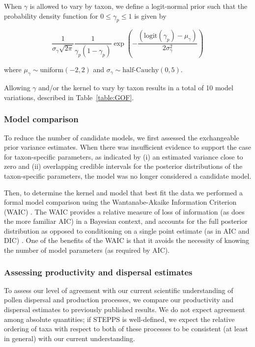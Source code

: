 \documentclass[12pt]{article}
\begin{document}
When $\gamma$ is allowed to vary by taxon, we define a logit-normal
prior such that the probability density function for $0 \leq \gamma_p
\leq 1$ is given by
\begin{linenomath*}
\begin{equation}
\frac{1}{\sigma_\gamma \sqrt{2 \pi}}\frac{1}{ \gamma_p ( 1 - \gamma_p )}\exp \left(- \frac{(\text{logit}(\gamma_p) - \mu_{\gamma})}{2 \sigma_{\gamma}^2} \right)
\end{equation} 
\end{linenomath*}
where $\mu_{\gamma} \sim \text{uniform}(-2, 2)$ and $\sigma_{\gamma}
\sim \text{half-Cauchy}(0,5)$.

Allowing $\gamma$ and/or the kernel to vary by taxon results in a
total of 10 model variations, described in Table~\ref{table:GOF}. 

\subsubsection*{Model comparison}

To reduce the number of candidate models, we first assessed the
exchangeable prior variance estimates. When there was insufficient
evidence to support the case for taxon-specific parameters, as
indicated by (i) an estimated variance close to zero and (ii)
overlapping credible intervals for the posterior distributions of the
taxon-specific parameters, the model was no longer considered a
candidate model.

Then, to determine the kernel and model that best fit the data we
performed a formal model comparison using the Wantanabe-Akaike
Information Criterion (WAIC) \citep{watanabe2010asymptotic}. The WAIC
provides a relative measure of loss of information (as does the more
familiar AIC) in a Bayesian context, and accounts for the full
posterior distribution as opposed to conditioning on a single point
estimate (as in AIC and DIC) \citep{gelman2014understanding}. One of
the benefits of the WAIC is that it avoids the necessity of knowing
the number of model parameters (as required by AIC).

\subsubsection*{Assessing productivity and dispersal estimates}

To assess our level of agreement with our current scientific
understanding of pollen dispersal and production processes, we compare
our productivity and dispersal estimates to previously published
results. We do not expect agreement among absolute quantities; if
STEPPS is well-defined, we expect the relative ordering of taxa with
respect to both of these processes to be consistent (at least in
general) with our current understanding.
\end{document}
